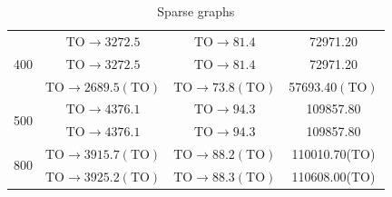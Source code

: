 \begin{table}[h]
\begin{tabular}{c|c|c|c}
        \cmidrule(lr){1-4}

        \multirow{3}{*}{400}
            & $\mathrm{TO} \rightarrow 3272.5$ & $\mathrm{TO} \rightarrow 81.4$ & 72971.20 \\
            & $\mathrm{TO} \rightarrow 3272.5$ & $\mathrm{TO} \rightarrow 81.4$ & 72971.20 \\
            & $\mathrm{TO} \rightarrow 2689.5(\mathrm{TO})$ & $\mathrm{TO} \rightarrow 73.8(\mathrm{TO})$ & 57693.40$(\mathrm{TO})$ \\

        \cmidrule(lr){1-4}

        \multirow{2}{*}{500}
            & $\mathrm{TO} \rightarrow 4376.1$ & $\mathrm{TO} \rightarrow 94.3$ & 109857.80 \\
            & $\mathrm{TO} \rightarrow 4376.1$ & $\mathrm{TO} \rightarrow 94.3$ & 109857.80 \\

        \cmidrule(lr){1-4}

        \multirow{2}{*}{800}
            & $\mathrm{TO} \rightarrow 3915.7(\mathrm{TO})$ & $\mathrm{TO} \rightarrow 88.2(\mathrm{TO})$ & 110010.70($\mathrm{TO}$) \\
            & $\mathrm{TO} \rightarrow 3925.2(\mathrm{TO})$ & $\mathrm{TO} \rightarrow 88.3(\mathrm{TO})$ & 110608.00($\mathrm{TO}$) \\

        \bottomrule
    \end{tabular}
    \caption*{Sparse graphs}\end{table}


